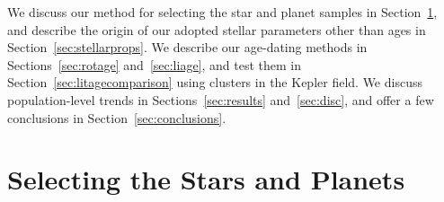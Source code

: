 \documentclass[11pt,twocolumn,tighten,linenumbers,trackchanges]{aastex63}
\begin{document}
We discuss our method for selecting the star and planet samples in
Section~\ref{sec:selection}, and describe the origin of our adopted
stellar parameters other than ages in Section~\ref{sec:stellarprops}.
We describe our age-dating methods in Sections~\ref{sec:rotage}
and~\ref{sec:liage}, and test them in
Section~\ref{sec:litagecomparison} using clusters in the Kepler field.
We discuss population-level trends in Sections~\ref{sec:results}
and~\ref{sec:disc}, and offer a few conclusions in
Section~\ref{sec:conclusions}.


\section{Selecting the Stars and Planets}
\label{sec:selection}


\begin{figure}[!t]
	\begin{center}
	

\end{center}
\end{figure}
\end{document}
